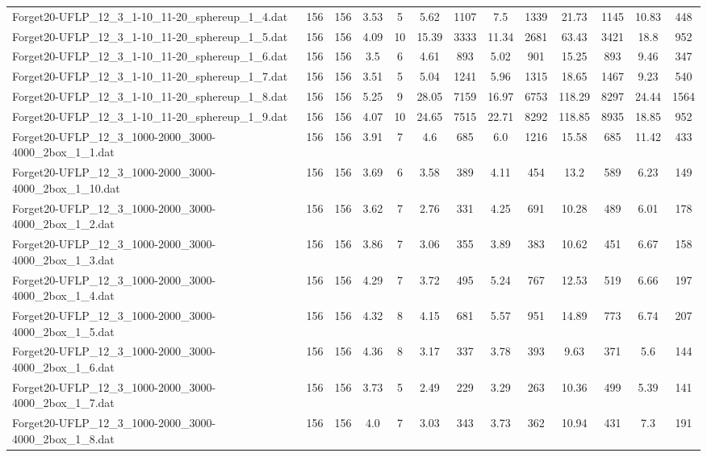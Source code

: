 \begin{table}[!ht]
{\begin{tabular}{lcccccccccccc}
Forget20-UFLP\_12\_3\_1-10\_11-20\_sphereup\_1\_4.dat & 156 & 156 & 3.53 & 5 & 5.62 & 1107 & 7.5 & 1339 & 21.73 & 1145 & 10.83 & 448 \\
Forget20-UFLP\_12\_3\_1-10\_11-20\_sphereup\_1\_5.dat & 156 & 156 & 4.09 & 10 & 15.39 & 3333 & 11.34 & 2681 & 63.43 & 3421 & 18.8 & 952 \\
Forget20-UFLP\_12\_3\_1-10\_11-20\_sphereup\_1\_6.dat & 156 & 156 & 3.5 & 6 & 4.61 & 893 & 5.02 & 901 & 15.25 & 893 & 9.46 & 347 \\
Forget20-UFLP\_12\_3\_1-10\_11-20\_sphereup\_1\_7.dat & 156 & 156 & 3.51 & 5 & 5.04 & 1241 & 5.96 & 1315 & 18.65 & 1467 & 9.23 & 540 \\
Forget20-UFLP\_12\_3\_1-10\_11-20\_sphereup\_1\_8.dat & 156 & 156 & 5.25 & 9 & 28.05 & 7159 & 16.97 & 6753 & 118.29 & 8297 & 24.44 & 1564 \\
Forget20-UFLP\_12\_3\_1-10\_11-20\_sphereup\_1\_9.dat & 156 & 156 & 4.07 & 10 & 24.65 & 7515 & 22.71 & 8292 & 118.85 & 8935 & 18.85 & 952 \\
Forget20-UFLP\_12\_3\_1000-2000\_3000-4000\_2box\_1\_1.dat & 156 & 156 & 3.91 & 7 & 4.6 & 685 & 6.0 & 1216 & 15.58 & 685 & 11.42 & 433 \\
Forget20-UFLP\_12\_3\_1000-2000\_3000-4000\_2box\_1\_10.dat & 156 & 156 & 3.69 & 6 & 3.58 & 389 & 4.11 & 454 & 13.2 & 589 & 6.23 & 149 \\
Forget20-UFLP\_12\_3\_1000-2000\_3000-4000\_2box\_1\_2.dat & 156 & 156 & 3.62 & 7 & 2.76 & 331 & 4.25 & 691 & 10.28 & 489 & 6.01 & 178 \\
Forget20-UFLP\_12\_3\_1000-2000\_3000-4000\_2box\_1\_3.dat & 156 & 156 & 3.86 & 7 & 3.06 & 355 & 3.89 & 383 & 10.62 & 451 & 6.67 & 158 \\
Forget20-UFLP\_12\_3\_1000-2000\_3000-4000\_2box\_1\_4.dat & 156 & 156 & 4.29 & 7 & 3.72 & 495 & 5.24 & 767 & 12.53 & 519 & 6.66 & 197 \\
Forget20-UFLP\_12\_3\_1000-2000\_3000-4000\_2box\_1\_5.dat & 156 & 156 & 4.32 & 8 & 4.15 & 681 & 5.57 & 951 & 14.89 & 773 & 6.74 & 207 \\
Forget20-UFLP\_12\_3\_1000-2000\_3000-4000\_2box\_1\_6.dat & 156 & 156 & 4.36 & 8 & 3.17 & 337 & 3.78 & 393 & 9.63 & 371 & 5.6 & 144 \\
Forget20-UFLP\_12\_3\_1000-2000\_3000-4000\_2box\_1\_7.dat & 156 & 156 & 3.73 & 5 & 2.49 & 229 & 3.29 & 263 & 10.36 & 499 & 5.39 & 141 \\
Forget20-UFLP\_12\_3\_1000-2000\_3000-4000\_2box\_1\_8.dat & 156 & 156 & 4.0 & 7 & 3.03 & 343 & 3.73 & 362 & 10.94 & 431 & 7.3 & 191 \\

\end{tabular}}
\end{table}
